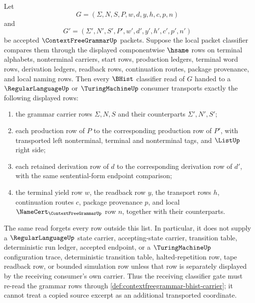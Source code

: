 \begin{lemma}
\label{lem:contextfreegrammar-bhist-classifier-alignment-boundary}
Let
$$
G=(\Sigma,N,S,P,w,d,y,h,c,p,n)
$$
and
$$
G'=(\Sigma',N',S',P',w',d',y',h',c',p',n')
$$
be accepted $\ContextFreeGrammarUp$ packets. Suppose the local packet
classifier compares them through the displayed componentwise $\hsame$ rows on
terminal alphabets, nonterminal carriers, start rows, production ledgers,
terminal word rows, derivation ledgers, readback rows, continuation routes,
package provenance, and local naming rows. Then every $\BHist$ classifier read
of $G$ handed to a $\RegularLanguageUp$ or $\TuringMachineUp$ consumer
transports exactly the following displayed rows:
\begin{enumerate}
\item the grammar carrier rows $\Sigma,N,S$ and their counterparts
$\Sigma',N',S'$;
\item each production row of $P$ to the corresponding production row of $P'$,
with transported left nonterminal, terminal and nonterminal tags, and
$\ListUp$ right side;
\item each retained derivation row of $d$ to the corresponding derivation row
of $d'$, with the same sentential-form endpoint comparison;
\item the terminal yield row $w$, the readback row $y$, the transport rows
$h$, continuation routes $c$, package provenance $p$, and local
$\NameCert_{\ContextFreeGrammarUp}$ row $n$, together with their counterparts.
\end{enumerate}
The same read forgets every row outside this list. In particular, it does not
supply a $\RegularLanguageUp$ state carrier, accepting-state carrier,
transition table, deterministic run ledger, accepted endpoint, or a
$\TuringMachineUp$ configuration trace, deterministic transition table,
halted-repetition row, tape readback row, or bounded simulation row unless
that row is separately displayed by the receiving consumer's own carrier.
Thus the receiving classifier gate must re-read the grammar rows through
\autoref{def:contextfreegrammar-bhist-carrier}; it cannot treat a copied
source excerpt as an additional transported coordinate.
\end{lemma}
